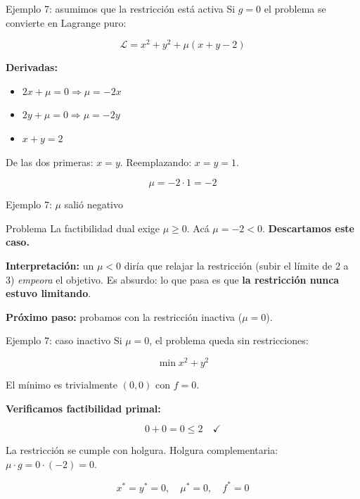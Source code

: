 \documentclass{beamer}
\begin{document}
\begin{frame}{Ejemplo 7: asumimos que la restricción está activa}
    \small
    Si $g = 0$ el problema se convierte en Lagrange puro:

    \[
    \mathcal{L} = x^2 + y^2 + \mu(x + y - 2)
    \]

    \vspace{0.3em}

    \textbf{Derivadas:}
    \begin{itemize}
        \item $2x + \mu = 0 \Rightarrow \mu = -2x$
        \item $2y + \mu = 0 \Rightarrow \mu = -2y$
        \item $x + y = 2$
    \end{itemize}

    \vspace{0.3em}

    De las dos primeras: $x = y$. Reemplazando: $x = y = 1$.

    \[
    \mu = -2 \cdot 1 = -2
    \]
\end{frame}

\begin{frame}{Ejemplo 7: $\mu$ salió negativo}
    \small
    \begin{alertblock}{Problema}
        La factibilidad dual exige $\mu \geq 0$. Acá $\mu = -2 < 0$. \textbf{Descartamos este caso.}
    \end{alertblock}

    \vspace{0.5em}

    \textbf{Interpretación:} un $\mu < 0$ diría que relajar la restricción (subir el límite de 2 a 3) \textit{empeora} el objetivo. Es absurdo: lo que pasa es que \textbf{la restricción nunca estuvo limitando}.

    \vspace{0.5em}

    \textbf{Próximo paso:} probamos con la restricción inactiva ($\mu = 0$).
\end{frame}

\begin{frame}{Ejemplo 7: caso inactivo}
    \small
    Si $\mu = 0$, el problema queda sin restricciones:

    \[
    \min x^2 + y^2
    \]

    \vspace{0.3em}

    El mínimo es trivialmente $(0, 0)$ con $f = 0$.

    \vspace{0.5em}

    \textbf{Verificamos factibilidad primal:}

    \[
    0 + 0 = 0 \leq 2 \quad \checkmark
    \]

    \vspace{0.3em}

    La restricción se cumple con holgura. Holgura complementaria: $\mu \cdot g = 0 \cdot (-2) = 0$. \checkmark

    \[
    \boxed{x^* = y^* = 0, \quad \mu^* = 0, \quad f^* = 0}
    \]
\end{frame}
\end{document}
